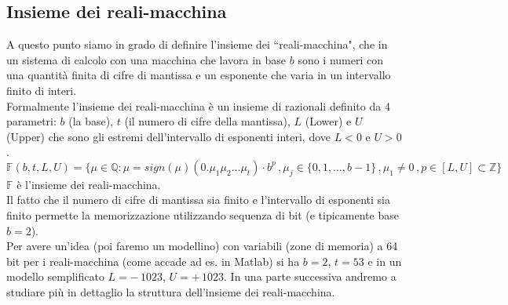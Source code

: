 \subsection{Insieme dei reali-macchina}
A questo punto siamo in grado di definire l'insieme dei ``reali-macchina", che in un sistema di calcolo con una macchina che lavora in base $b$ sono i numeri con una quantità finita di cifre di mantissa e un esponente che varia in un intervallo finito di interi. \\
Formalmente l'insieme dei reali-macchina è un insieme di razionali definito da 4 parametri: $b$ (la base), $t$ (il numero di cifre della mantissa), $L$ (Lower) e $U$ (Upper) che sono gli estremi dell'intervallo di esponenti interi, dove $L < 0$ e $U > 0$.
\[ \mathbb{F} (b, t, L, U) = \{ \mu \in \mathbb{Q} \colon \mu = sign(\mu)(0.\mu_1 \mu_2 \dotsc \mu_t) \cdot b^p \,, \mu_j \in \{0, 1, \dotsc , b-1\} \,, \mu_1 \ne 0 \,, p \in [L,U] \subset \mathbb{Z} \} \]
$\mathbb{F}$ è l'insieme dei reali-macchina.\\
Il fatto che il numero di cifre di mantissa sia finito e l'intervallo di esponenti sia finito permette la memorizzazione utilizzando sequenza di bit (e tipicamente base $b=2$). \\
Per avere un'idea (poi faremo un modellino) con variabili (zone di memoria) a 64 bit per i reali-macchina (come accade ad es. in Matlab) si ha $b=2$, $t=53$ e in un modello semplificato $L=-\,1023$, $U=+\,1023$. In una parte successiva andremo a studiare più in dettaglio la struttura dell'insieme dei reali-macchina.

